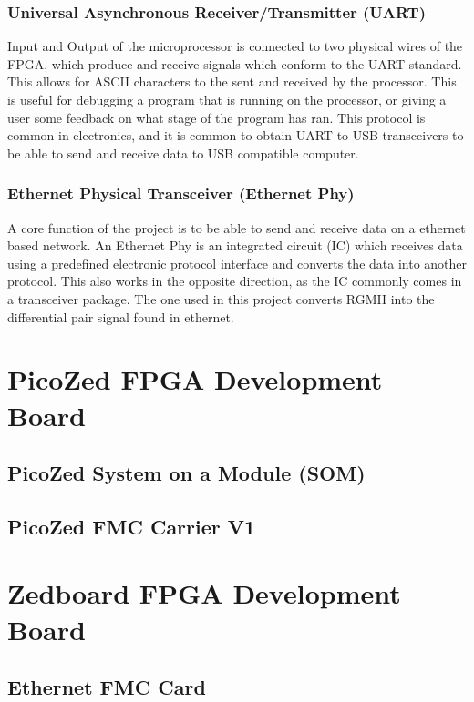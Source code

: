 \subsubsection{Universal Asynchronous Receiver/Transmitter (UART)}

\par Input and Output of the microprocessor is connected to two physical wires of the FPGA, which produce and 
receive signals which conform to the UART standard. This allows for ASCII characters to the sent and received by 
the processor. This is useful for debugging a program that is running on the processor, or giving a user some 
feedback on what stage of the program has ran. This protocol is common in electronics, and it is common to obtain 
UART to USB transceivers to be able to send and receive data to USB compatible computer.

\subsubsection{Ethernet Physical Transceiver (Ethernet Phy)}

\par A core function of the project is to be able to send and receive data on a ethernet based network. An Ethernet 
Phy is an integrated circuit (IC) which receives data using a predefined electronic protocol interface and converts 
the data into another protocol. This also works in the opposite direction, as the IC commonly comes in a transceiver 
package. The one used in this project converts RGMII into the differential pair signal found in ethernet. 

\section{PicoZed FPGA Development Board}
\subsection{PicoZed System on a Module (SOM)}
\subsection{PicoZed FMC Carrier V1}
\section{Zedboard FPGA Development Board}
\subsection{Ethernet FMC Card}
